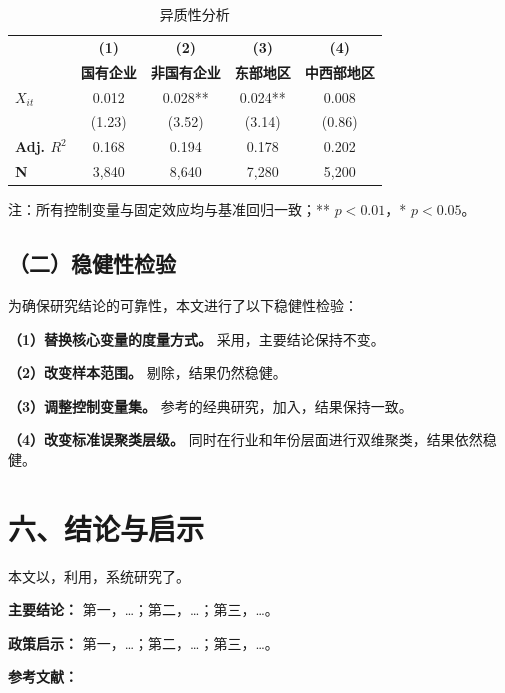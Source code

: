 \documentclass[lang=cn, aaffiliation={中国}]{ctexart}
\begin{document}
\begin{table}[htbp]
    \centering
    \caption{异质性分析}
    \label{tab:hetero}
    \begin{threeparttable}
        \begin{tabular}{lcccc}
            \toprule
            \textbf{} & \textbf{(1)} & \textbf{(2)} & \textbf{(3)} & \textbf{(4)} \\
            & \textbf{国有企业} & \textbf{非国有企业} & \textbf{东部地区} & \textbf{中西部地区} \\
            \midrule
            $X_{it}$ & 0.012 & 0.028\*** & 0.024\*** & 0.008 \\
              & (1.23) & (3.52) & (3.14) & (0.86) \\
            \midrule
            \textbf{Adj. $R^2$} & 0.168 & 0.194 & 0.178 & 0.202 \\
            \textbf{N} & 3,840 & 8,640 & 7,280 & 5,200 \\
            \bottomrule
        \end{tabular}
        \begin{tablenotes}\footnotesize
            \item 注：所有控制变量与固定效应均与基准回归一致；\*** $p<0.01$，\** $p<0.05$。
        \end{tablenotes}
    \end{threeparttable}
\end{table}

\subsection{（二）稳健性检验}
\label{sec:robust}

为确保研究结论的可靠性，本文进行了以下稳健性检验：

\textbf{（1）替换核心变量的度量方式。}
采用，主要结论保持不变。

\textbf{（2）改变样本范围。}
剔除，结果仍然稳健。

\textbf{（3）调整控制变量集。}
参考\citet{xxx}的经典研究，加入，结果保持一致。

\textbf{（4）改变标准误聚类层级。}
同时在行业和年份层面进行双维聚类，结果依然稳健。

\section{六、结论与启示}
\label{sec:conclusion}

本文以，利用，系统研究了。

\textbf{主要结论：}
第一，\dots；第二，\dots；第三，\dots。

\textbf{政策启示：}
第一，\dots；第二，\dots；第三，\dots。

\textbf{参考文献：}

\end{document}
